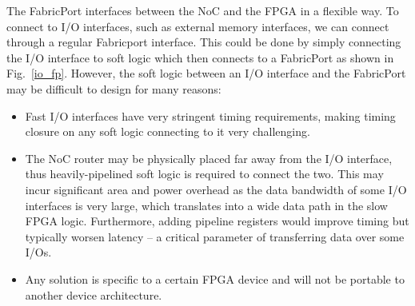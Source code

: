 The FabricPort interfaces between the NoC and the FPGA in a flexible way.
To connect to I/O interfaces, such as external memory interfaces, we can connect through a regular Fabricport interface.
This could be done by simply connecting the I/O interface to soft logic which then connects to a FabricPort as shown in Fig.~\ref{io_fp}.
However, the soft logic between an I/O interface and the FabricPort may be difficult to design for many reasons:

%
\begin{itemize}
    \item Fast I/O interfaces have very stringent timing requirements, making timing closure on any soft logic connecting to it very challenging.
    \item The NoC router may be physically placed far away from the I/O interface, thus heavily-pipelined soft logic is required to connect the two. This may incur significant area and power overhead as the data bandwidth of some I/O interfaces is very large, which translates into a wide data path in the slow FPGA logic. Furthermore, adding pipeline registers would improve timing but typically worsen latency -- a critical parameter of transferring data over some I/Os.
    \item Any solution is specific to a certain FPGA device and will not be portable to another device architecture.
\end{itemize}
%

